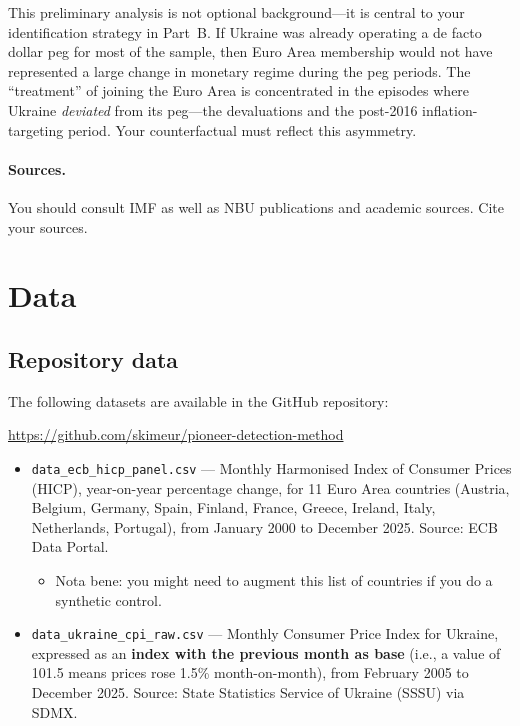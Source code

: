 \documentclass[11pt,a4paper]{article}
\begin{document}
This preliminary analysis is not optional background---it is central to your
identification strategy in Part~B. If Ukraine was already operating a de facto
dollar peg for most of the sample, then Euro Area membership would not have
represented a large change in monetary regime during the peg periods. The
``treatment'' of joining the Euro Area is concentrated in the episodes where
Ukraine \emph{deviated} from its peg---the devaluations and the post-2016
inflation-targeting period. Your counterfactual must reflect this asymmetry.

\paragraph{Sources.} You should consult IMF as well as NBU publications and academic sources. Cite your sources.


\section*{Data}

\subsection*{Repository data}

The following datasets are available in the GitHub repository:

\begin{center}
\url{https://github.com/skimeur/pioneer-detection-method}
\end{center}

\begin{itemize}[leftmargin=2em]
  \item \texttt{data\_ecb\_hicp\_panel.csv} --- Monthly Harmonised Index of
    Consumer Prices (HICP), year-on-year percentage change, for 11 Euro Area
    countries (Austria, Belgium, Germany, Spain, Finland, France, Greece,
    Ireland, Italy, Netherlands, Portugal), from January 2000 to December 2025.
    Source: ECB Data Portal.
    \begin{itemize}
    \item Nota bene: you might need to augment this list of countries if you do a synthetic control.
    \end{itemize}

  \item \texttt{data\_ukraine\_cpi\_raw.csv} --- Monthly Consumer Price Index
    for Ukraine, expressed as an \textbf{index with the previous month as base}
    (i.e., a value of 101.5 means prices rose 1.5\% month-on-month), from
    February 2005 to December 2025. Source: State Statistics Service of Ukraine
    (SSSU) via SDMX.
\end{itemize}
\end{document}
